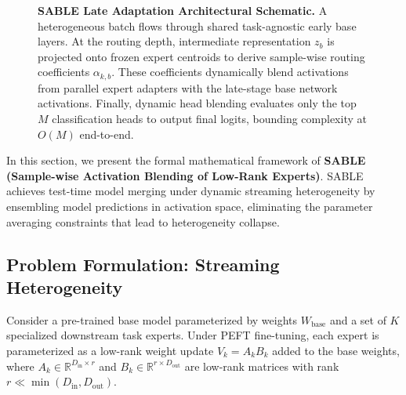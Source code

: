 \begin{figure}[t]
{%
}
\caption{\textbf{SABLE Late Adaptation Architectural Schematic.} A heterogeneous batch flows through shared task-agnostic early base layers. At the routing depth, intermediate representation $z_b$ is projected onto frozen expert centroids to derive sample-wise routing coefficients $\alpha_{k, b}$. These coefficients dynamically blend activations from parallel expert adapters with the late-stage base network activations. Finally, dynamic head blending evaluates only the top $M$ classification heads to output final logits, bounding complexity at $O(M)$ end-to-end.}
\label{fig:schematic}
\end{figure}

In this section, we present the formal mathematical framework of \textbf{SABLE (Sample-wise Activation Blending of Low-Rank Experts)}. SABLE achieves test-time model merging under dynamic streaming heterogeneity by ensembling model predictions in activation space, eliminating the parameter averaging constraints that lead to heterogeneity collapse.

\subsection{Problem Formulation: Streaming Heterogeneity}
Consider a pre-trained base model parameterized by weights $W_{\text{base}}$ and a set of $K$ specialized downstream task experts. Under PEFT fine-tuning, each expert is parameterized as a low-rank weight update $V_k = A_k B_k$ added to the base weights, where $A_k \in \mathbb{R}^{D_{\text{in}} \times r}$ and $B_k \in \mathbb{R}^{r \times D_{\text{out}}}$ are low-rank matrices with rank $r \ll \min(D_{\text{in}}, D_{\text{out}})$.

